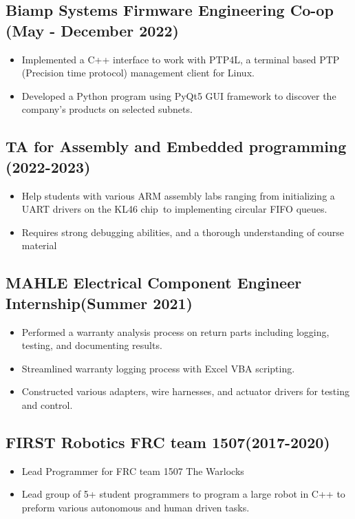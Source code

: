 \documentclass{article}
\begin{document}
    \subsection{Biamp Systems Firmware Engineering Co-op \hfill (May - December 2022)}
        \begin{itemize}[noitemsep]
            \item Implemented a C++ interface to work with PTP4L, a terminal based 
                PTP (Precision time protocol) management client for Linux.  
            \item Developed a Python program using PyQt5 GUI framework to
                discover the company's products on selected subnets.
        \end{itemize}

    \subsection{TA for Assembly and Embedded programming \hfill (2022-2023)}
    \begin{itemize}[noitemsep]
        \item Help students with various ARM assembly labs ranging from initializing 
            a UART drivers on the KL46 chip\, to implementing circular FIFO queues. 
        \item Requires strong debugging abilities, and a thorough understanding of 
            course material
    \end{itemize}

    \subsection{MAHLE Electrical Component Engineer Internship\hfill (Summer 2021)}
        \begin{itemize}[noitemsep]
            \item Performed a warranty analysis process on return parts including 
                logging, testing, and documenting results.
            \item Streamlined warranty logging process with Excel VBA scripting.
            \item Constructed various adapters, wire harnesses, and actuator drivers 
                for testing and control.
        \end{itemize}

    \subsection{FIRST Robotics FRC team 1507\hfill (2017-2020)}
        \begin{itemize}[noitemsep]
            \item Lead Programmer for FRC team 1507 The Warlocks
            \item Lead group of 5+ student programmers to program a large robot in 
                C++ to preform various autonomous and human driven tasks.
        \end{itemize}
 
\end{document}
